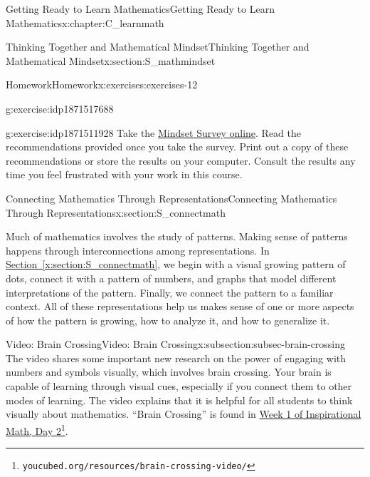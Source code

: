 \documentclass[oneside,10pt,]{book}
\newcommand{\xreffont}{\relax}
\numberwithin{equation}{chapter}
\begin{document}
\begin{chapterptx}{Getting Ready to Learn Mathematics}{}{Getting Ready to Learn Mathematics}{}{}{x:chapter:C_learnmath}
\begin{sectionptx}{Thinking Together and Mathematical Mindset}{}{Thinking Together and Mathematical Mindset}{}{}{x:section:S_mathmindset}
\begin{exercises-subsection}{Homework}{}{Homework}{}{}{x:exercises:exercises-12}
\begin{divisionexercise}{2}{}{}{g:exercise:idp1871517688}
\end{divisionexercise}%
\begin{divisionexercise}{3}{}{}{g:exercise:idp1871511928}%
Take the \href{https://www.mindsetworks.com/assess/}{Mindset Survey online}\footnotemark{}. Read the recommendations provided once you take the survey. Print out a copy of these recommendations or store the results on your computer. Consult the results any time you feel frustrated with your work in this course.%
\end{divisionexercise}%
%
\end{exercises-subsection}
\end{sectionptx}
%
%
\typeout{************************************************}
\typeout{************************************************}
%
\begin{sectionptx}{Connecting Mathematics Through Representations}{}{Connecting Mathematics Through Representations}{}{}{x:section:S_connectmath}
\begin{introduction}{}%
Much of mathematics involves the study of patterns. Making sense of patterns happens through interconnections among representations. In \hyperref[x:section:S_connectmath]{Section~{\xreffont\ref{x:section:S_connectmath}}}, we begin with a visual growing pattern of dots, connect it with a pattern of numbers, and graphs that model different interpretations of the pattern. Finally, we connect the pattern to a familiar context. All of these representations help us makes sense of one or more aspects of how the pattern is growing, how to analyze it, and how to generalize it.%
\end{introduction}%
%
%
\typeout{************************************************}
\typeout{************************************************}
%
\begin{subsectionptx}{Video: Brain Crossing}{}{Video: Brain Crossing}{}{}{x:subsection:subsec-brain-crossing}
The video shares some important new research on the power of engaging with numbers and symbols visually, which involves brain crossing. Your brain is capable of learning through visual cues, especially if you connect them to other modes of learning. The video explains that it is helpful for all students to think visually about mathematics. ``Brain Crossing'' is found in \href{https://www.youcubed.org/resources/brain-crossing-video/}{Week 1 of Inspirational Math, Day 2}\footnote{\nolinkurl{youcubed.org/resources/brain-crossing-video/}\label{g:fn:idp1871519224}}.%

\end{subsectionptx}
\end{sectionptx}
\end{chapterptx}
\end{document}
